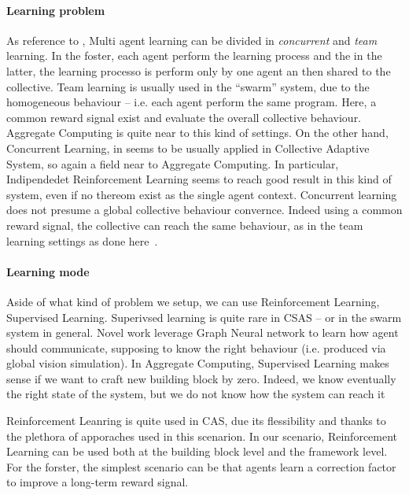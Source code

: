 \documentclass[
  twocolumn,
]{ceurart}
\begin{document}
\paragraph{Learning problem} As reference to \cite{mas-anc-cooperation}, Multi agent learning can be
 divided in \textit{concurrent} and \textit{team} learning. In the foster, each agent perform the 
 learning process and the in the latter, the learning processo is perform only by one agent an then 
 shared to the collective.
 Team learning is usually used in the ``swarm'' system, due to the homogeneous behaviour -- i.e. each
 agent perform the same program. Here, a common reward signal exist and evaluate the overall collective behaviour.
 Aggregate Computing is quite near to this kind of settings.
 On the other hand, Concurrent Learning, in \cite{csas-and-marl} seems to be usually applied in Collective
 Adaptive System, so again a field near to Aggregate Computing. In particular, Indipendedet Reinforcement Learning
 seems to reach good result in this kind of system, even if no thereom exist as the single agent context.
 Concurrent learning does not presume a global collective behaviour convernce. Indeed using a common reward signal,
 the collective can reach the same behaviour, as in the team learning settings as done here~\cite{iima2008swarm}.
\paragraph{Learning mode}
Aside of what kind of problem we setup, we can use Reinforcement Learning, Supervised Learning.
 Superivsed learning is quite rare in CSAS -- or in the swarm system in general. Novel work leverage Graph Neural network
 to learn how agent should communicate, supposing to know the right behaviour (i.e. produced via global vision simulation).
 In Aggregate Computing, Supervised Learning makes sense if we want to craft new building block by zero. 
 Indeed, we know eventually the right state of the system, but we do not know how the system can reach it

 Reinforcement Leanring is quite used in CAS, 
 due its flessibility and thanks to the plethora of apporaches used in this scenarion.
 In our scenario, Reinforcement Learning can be used both at the building block level and the framework level.
 For the forster, the simplest scenario can be that agents learn a correction factor to improve a long-term
 reward signal.
 
\end{document}
